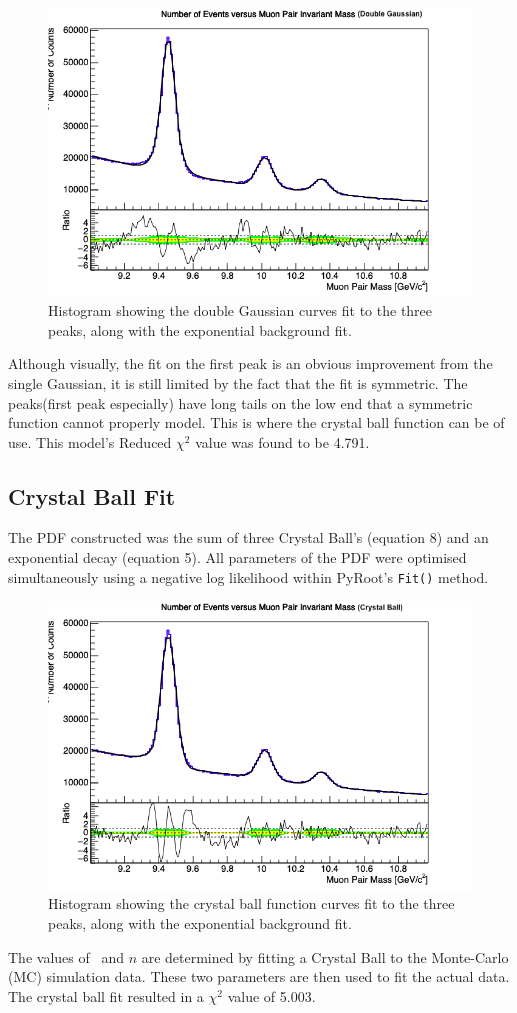 \begin{figure}[H]
\centering
\includegraphics[width=0.7\columnwidth]{figures/xmass_hist_d_gauss.png}
\caption{Histogram showing the double Gaussian curves fit to the three peaks, along with the exponential background fit.}
\label{fig:2d_hists_ex}
\end{figure}

Although visually, the fit on the first peak is an obvious improvement from the single Gaussian, it is still limited by the fact that the fit is symmetric. The peaks(first peak especially) have long tails on the low end that a symmetric function cannot properly model. This is where the crystal ball function can be of use. This model's Reduced $\chi ^2$ value was found to be 4.791.

\subsection*{Crystal Ball Fit}

The PDF constructed was the sum of three Crystal Ball's (equation 8) and an exponential decay (equation 5). All parameters of the PDF were optimised simultaneously using a negative log likelihood within PyRoot's \verb|Fit()| method.

\begin{figure}[H]
\centering
\includegraphics[width=0.7\columnwidth]{figures/xmass_hist_cb.png}
\caption{Histogram showing the crystal ball function curves fit to the three peaks, along with the exponential background fit.}
\label{fig:2d_hists_ex}
\end{figure}

 The values of \textalpha\ and $n$ are determined by fitting a Crystal Ball to the Monte-Carlo (MC) simulation data. These two parameters are then used to fit the actual data. The crystal ball fit resulted in a $\chi ^2$ value of 5.003.\\